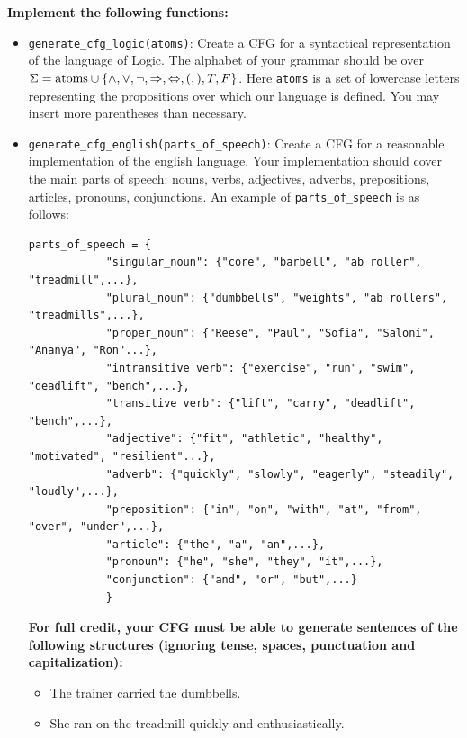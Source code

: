 \documentclass{article}
\begin{document}
\begin{tcolorbox}[enhanced,interior style={top color=Dandelion!20,bottom color=Dandelion!30}]
    \textbf{Implement the following functions:}

    \begin{itemize}
        \item \lstinline{generate_cfg_logic(atoms)}: Create a CFG for a syntactical representation of the language of Logic. The alphabet of your grammar should be over $\Sigma = \text{\lstinline{atoms}} \cup \{\land, \lor, \neg, \Rightarrow, \Leftrightarrow, (, ), T, F\}$. Here \lstinline{atoms} is a set of lowercase letters representing the propositions over which our language is defined. You may insert more parentheses than necessary.
        \item
        \lstinline{generate_cfg_english(parts_of_speech)}: Create a CFG for a reasonable implementation of the english language.
        Your implementation should cover the main parts of speech: nouns, verbs, adjectives, adverbs, prepositions, articles, pronouns, conjunctions. An example of \lstinline{parts_of_speech} is as follows:
        \begin{lstlisting}[belowskip=-10pt]
        parts_of_speech = {
            "singular_noun": {"core", "barbell", "ab roller", "treadmill",...},
            "plural_noun": {"dumbbells", "weights", "ab rollers", "treadmills",...},
            "proper_noun": {"Reese", "Paul", "Sofia", "Saloni", "Ananya", "Ron"...},
            "intransitive verb": {"exercise", "run", "swim", "deadlift", "bench",...},
            "transitive verb": {"lift", "carry", "deadlift", "bench",...},
            "adjective": {"fit", "athletic", "healthy", "motivated", "resilient"...},
            "adverb": {"quickly", "slowly", "eagerly", "steadily", "loudly",...},
            "preposition": {"in", "on", "with", "at", "from", "over", "under",...},
            "article": {"the", "a", "an",...},
            "pronoun": {"he", "she", "they", "it",...},
            "conjunction": {"and", "or", "but",...}
            }
            \end{lstlisting}
            \textbf{For full credit, your CFG must be able to generate sentences of the following structures (ignoring tense, spaces, punctuation and capitalization):}
            \begin{itemize}
                \item The trainer carried the dumbbells.
                \item She ran on the treadmill quickly and enthusiastically.

\end{itemize}
\end{itemize}
\end{tcolorbox}
\end{document}
